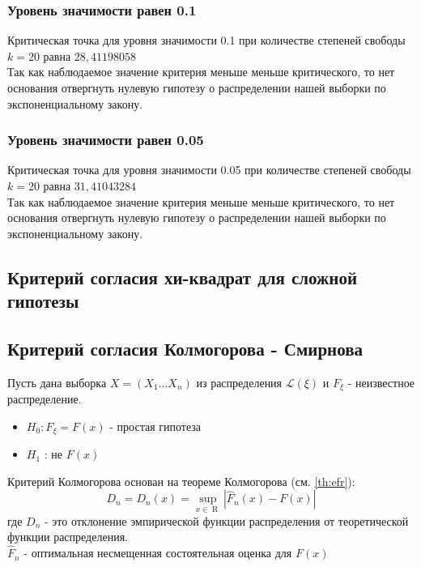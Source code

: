 \documentclass[a4paper,12pt, oneside]{book}
\begin{document}
\subsubsection{Уровень значимости равен 0.1}

Критическая точка для уровня значимости 0.1 при количестве степеней свободы $ k = 20 $ равна $28,41198058$\\

Так как наблюдаемое значение критерия меньше меньше критического, то нет основания отвергнуть нулевую гипотезу о распределении нашей выборки по экспоненциальному закону.  



\subsubsection{Уровень значимости равен 0.05} 

Критическая точка для уровня значимости 0.05 при количестве степеней свободы $ k = 20 $ равна $31,41043284$\\

Так как наблюдаемое значение критерия меньше меньше критического, то нет основания отвергнуть нулевую гипотезу о распределении нашей выборки по экспоненциальному закону.  

\subsection{Критерий согласия хи-квадрат для сложной гипотезы}


\subsection{Критерий согласия Колмогорова - Смирнова}

Пусть дана выборка $X = (X_1 \ldots X_n)$ из распределения $\mathscr{L}(\xi)$ и $F_\xi$ - неизвестное распределение.

\begin{itemize}
	\item $H_0 : F_\xi = F(x)$ - простая гипотеза
	\item $H_1$ : не $F(x)$
\end{itemize}
Критерий Колмогорова основан на теореме Колмогорова (см. \ref{th:efr}):
\[
D_n = D_n(x) = \underset{x \in \mathop{R}}{\sup } |\hat{F}_n(x) - F(x) |
\]
где $D_n$ - это отклонение эмпирической функции распределения от теоретической функции распределения.
\\
$\hat{F}_n$ - оптимальная несмещенная состоятельная оценка для $F(x)$
\\
\end{document}
